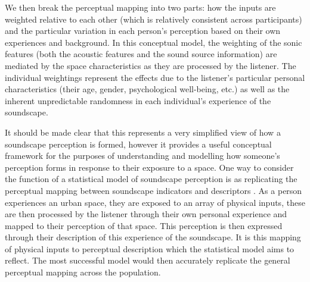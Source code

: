 We then break the perceptual mapping into two parts: how the inputs are weighted relative to each other (which is relatively consistent across participants) and the particular variation in each person's perception based on their own experiences and background. In this conceptual model, the weighting of the sonic features (both the acoustic features and the sound source information) are mediated by the space characteristics as they are processed by the listener. The individual weightings represent the effects due to the listener's particular personal characteristics (their age, gender, psychological well-being, etc.) as well as the inherent unpredictable randomness in each individual's experience of the soundscape. 

It should be made clear that this represents a very simplified view of how a soundscape perception is formed, however it provides a useful conceptual framework for the purposes of understanding and modelling how someone's perception forms in response to their exposure to a space. One way to consider the function of a statistical model of soundscape perception is as replicating the perceptual mapping between soundscape indicators and descriptors \citep{Lionello2021Thesis}. As a person experiences an urban space, they are exposed to an array of physical inputs, these are then processed by the listener through their own personal experience and mapped to their perception of that space. This perception is then expressed through their description of this experience of the soundscape. It is this mapping of physical inputs to perceptual description which the statistical model aims to reflect. The most successful model would then accurately replicate the general perceptual mapping across the population.



